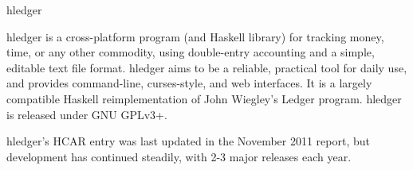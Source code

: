 \begin{hcarentry}[updated]{hledger}
\label{hledger}
\makeheader



hledger is a cross-platform program (and Haskell library) for tracking
money, time, or any other commodity, using double-entry accounting and
a simple, editable text file format.  
hledger aims to be a reliable, practical tool for daily use,
and provides command-line, curses-style, and web interfaces.
It is a largely compatible Haskell reimplementation of John Wiegley's Ledger program.
hledger is released under GNU GPLv3+.


hledger's HCAR entry was last updated in the November 2011 report, but
development has continued steadily, with 2-3 major releases each year.


\end{hcarentry}
